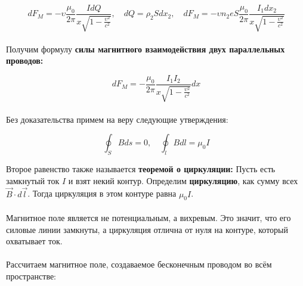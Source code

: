\documentclass[dvipdfmx]{article}
\begin{document}
\paragraph{}

\begin{equation*}
  dF_M = -\upsilon\frac{\mu_0}{2\pi} \frac{IdQ}{x\sqrt{1-\frac{\upsilon^2}{c^2}}}, \quad dQ = \rho_2Sdx_2,
  \quad dF_M = -\upsilon n_2eS\frac{\mu_0}{2\pi} \frac{I_1dx_2}{x\sqrt{1-\frac{\upsilon^2}{c^2}}}
\end{equation*}
\paragraph{}

Получим формулу \textbf{силы магнитного взаимодействия двух параллельных проводов:}

\begin{equation*}
  dF_M = -\frac{\mu_0}{2\pi} \frac{I_1I_2}{x\sqrt{1-\frac{\upsilon^2}{c^2}}} dx
\end{equation*}
\paragraph{}

Без доказательства примем на веру следующие утверждения:

\begin{equation*}
  \oint_SBds = 0, \quad \oint_lBdl = \mu_0I
\end{equation*}

Второе равенство также называется \textbf{теоремой о циркуляции:} Пусть есть замкнутый ток $I$ и взят некий контур.
Определим \textbf{циркуляцию}, как сумму всех $\vec{B}\cdot d\vec{l}$. Тогда циркуляция в этом контуре равна $\mu_0I$.

\paragraph{}

Магнитное поле является не потенциальным, а вихревым. Это значит, что его силовые линии замкнуты,
а циркуляция отлична от нуля на контуре, который охватывает ток.

\paragraph{}

Рассчитаем магнитное поле, создаваемое бесконечным проводом во всём пространстве:
\end{document}
